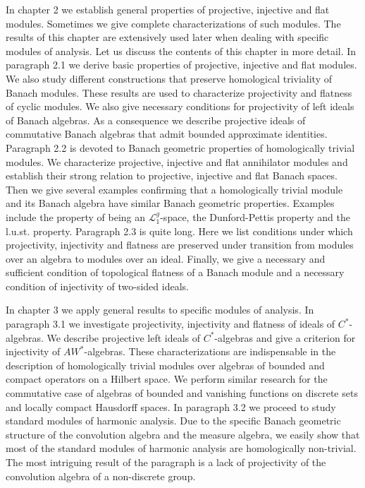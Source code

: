 \documentclass[11pt, a4paper, oneside]{thbook}
\begin{document}
In chapter 2 we establish general properties of projective, injective and flat
modules. Sometimes we give complete characterizations of such modules.
The results of this chapter are extensively used later when dealing with
specific modules of analysis. Let us discuss the contents of this chapter in more
detail. In paragraph 2.1 we derive basic properties of projective, injective and
flat modules. We also study different
constructions that preserve homological triviality of Banach modules. These
results are used to characterize projectivity and flatness of cyclic modules. We
also give necessary conditions for projectivity of left ideals of Banach
algebras. As a consequence we describe projective ideals of commutative Banach
algebras that admit bounded approximate identities. Paragraph 2.2 is devoted to
Banach geometric properties of homologically trivial modules. We characterize
projective, injective and flat annihilator modules and establish their strong
relation to projective, injective and flat Banach spaces. Then we give several
examples confirming that a homologically trivial module and its Banach algebra
have similar Banach geometric properties. Examples include the property of being
an $\mathscr{L}_1^g$-space, the Dunford-Pettis property and the l.u.st.
property. Paragraph 2.3 is quite long. Here we list conditions under which
projectivity, injectivity and flatness are preserved under transition from
modules over an algebra to modules over an ideal. Finally, we give a necessary and
sufficient condition of topological flatness of a Banach module and a necessary
condition of injectivity of two-sided ideals.

In chapter 3 we apply general results to specific modules of analysis. In
paragraph 3.1 we investigate projectivity, injectivity and flatness of ideals of
$C^*$-algebras. We describe projective left ideals of $C^*$-algebras and give a
criterion for injectivity of $AW^*$-algebras. These characterizations are
indispensable in the description of homologically trivial modules over algebras of
bounded and compact operators on a Hilbert space. We perform similar research
for the commutative case of algebras of bounded and vanishing functions on discrete
sets and locally compact Hausdorff spaces. In paragraph 3.2 we proceed to study 
standard modules of harmonic analysis. Due to the specific Banach geometric
structure of the convolution algebra and the measure algebra, we easily show that most of
the standard modules of harmonic analysis are homologically non-trivial. The most
intriguing result of the paragraph is a lack of projectivity of the convolution algebra 
of a non-discrete group. 
\end{document}
